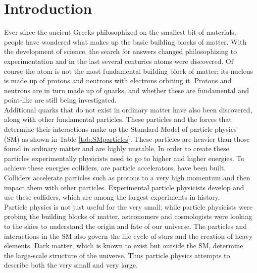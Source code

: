 \chapter{Introduction}
\label{ch:intro}



Ever since the ancient Greeks philosophized on the smallest bit of materials, people have wondered what makes up the basic building blocks of matter.  With the development of science, the search for answers changed philosophizing to experimentation and in the last several centuries atoms were discovered.  Of course the atom is not the most fundamental building block of matter; its nucleus is made up of protons and neutrons with electrons orbiting it.  Protons and neutrons are in turn made up of quarks, and whether these are fundamental and point-like are still being investigated.  \\

Additional quarks that do not exist in ordinary matter have also been discovered, along with other fundamental particles.  These particles and the forces that determine their interactions make up the Standard Model of particle physics (SM) as shown in Table \ref{tab:SMparticles}.  These particles are heavier than those found in ordinary matter and are highly unstable.  In order to create these particles experimentally physicists need to go to higher and higher energies.  To achieve these energies colliders, are particle accelerators, have been built.  Colliders accelerate particles such as protons to a very high momentum and then impact them with other particles.  Experimental particle physicists develop and use these colliders, which are among the largest experiments in history.  \\

Particle physics is not just useful for the very small; while particle physicists were probing the building blocks of matter, astronomers and cosmologists were looking to the skies to understand the origin and fate of our universe.  The particles and interactions in the SM also govern the life cycle of stars and the creation of heavy elements.  Dark matter, which is known to exist but outside the SM, determine the large-scale structure of the universe.  Thus particle physics attempts to describe both the very small and very large. \\

